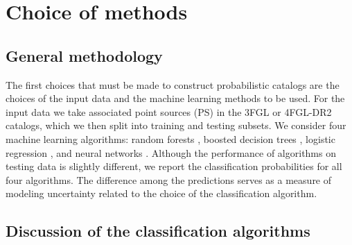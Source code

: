 \section{Choice of methods}

\subsection{General methodology}

The first choices that must be made to construct probabilistic catalogs are the choices of the input data and the machine learning methods to be used.
For the input data we take associated point sources (PS) in the 3FGL or 4FGL-DR2 catalogs, which we then split into training and testing subsets.
We consider four machine learning algorithms: random forests \citep[RF,][]{709601, Breiman:2001hzm}, 
boosted decision trees \citep[BDT,][]{friedman2001},  
logistic regression \citep[LR,][]{cox1958}, 
and neural networks \citep[NN,][]{Hopfield:1982pe}.
Although the performance of algorithms on testing data is slightly different, 
we report the classification probabilities for all four algorithms.
The difference among the predictions serves as a measure of modeling uncertainty related 
to the choice of the classification algorithm.

\subsection{Discussion of the classification algorithms}


